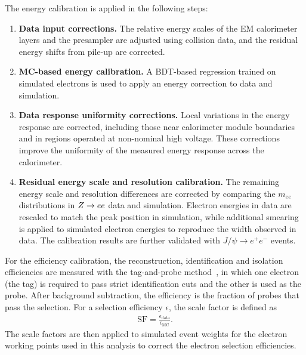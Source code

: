 The energy calibration is applied in the following steps:
\begin{enumerate}
    \item \textbf{Data input corrections.} The relative energy scales of the EM calorimeter layers and the presampler are adjusted using collision data, and the residual energy shifts from pile-up are corrected.
    \item \textbf{MC-based energy calibration.} A BDT-based regression trained on simulated electrons is used to apply an energy correction to data and simulation.
    \item \textbf{Data response uniformity corrections.} Local variations in the energy response are corrected, including those near calorimeter module boundaries and in regions operated at non-nominal high voltage. These corrections improve the uniformity of the measured energy response across the calorimeter.
    \item \textbf{Residual energy scale and resolution calibration.} The remaining energy scale and resolution differences are corrected by comparing the $m_{ee}$ distributions in $Z\rightarrow ee$ data and simulation. Electron energies in data are rescaled to match the peak position in simulation, while additional smearing is applied to simulated electron energies to reproduce the width observed in data. The calibration results are further validated with $J/\psi\rightarrow e^+e^-$ events.
\end{enumerate}

For the efficiency calibration, the reconstruction, identification and isolation efficiencies are measured with the tag-and-probe method~\cite{ATLAS2024ElectronPhotonEfficiencies}, in which one electron (the tag) is required to pass strict identification cuts and the other is used as the probe.
After background subtraction, the efficiency is the fraction of probes that pass the selection.
For a selection efficiency $\epsilon$, the scale factor is defined as
\begin{align}
    \mathrm{SF}=\frac{\epsilon_{\mathrm{data}}}{\epsilon_{\mathrm{MC}}}.
    \label{eq:ch6_efficiency_sf}
\end{align}
The scale factors are then applied to simulated event weights for the electron working points used in this analysis to correct the electron selection efficiencies.
